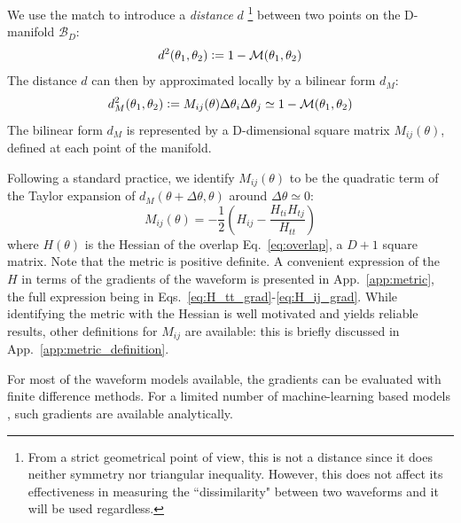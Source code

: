 \documentclass[twocolumn,showpacs,preprintnumbers,nofootinbib,prd,
superscriptaddress,10pt]{revtex4-2}
\begin{document}
We use the match to introduce a {\it distance} $d$ \footnote{
From a strict geometrical point of view, this is not a distance since it does neither symmetry nor triangular inequality. However, this does not affect its effectiveness in measuring the ``dissimilarity" between two waveforms and it will be used regardless.}
between two points on the D-manifold $\mathcal{B}_D$:
\begin{align}\label{eq:distance}
	d^2(\theta_1,\theta_2) \vcentcolon= 1 - \mathcal{M}(\theta_1,\theta_2)
\end{align}
The distance $d$ can then by approximated locally by a bilinear form $d_M$:
\begin{align}\label{eq:metric_definition}
	d_M^2(\theta_1,\theta_2) \vcentcolon= M_{ij}(\theta) \Delta\theta_i \Delta\theta_j \simeq 1 - \mathcal{M}(\theta_1,\theta_2)
\end{align}
The bilinear form $d_M$ is represented by a D-dimensional square matrix $M_{ij}(\theta)$, defined at each point of the manifold.

Following a standard practice, we identify $M_{ij}(\theta)$ to be the quadratic term of the Taylor expansion of $d_M(\theta+\Delta\theta,\theta)$ around $\Delta\theta\simeq 0$:
\begin{equation}\label{eq:metric_expression}
	M_{ij}(\theta) = - \frac{1}{2} \left( H_{ij} - \frac{H_{ti}H_{tj}}{H_{tt}} \right)
\end{equation}
where $H(\theta)$ is the Hessian of the overlap Eq.~\eqref{eq:overlap}, a $D+1$ square matrix.
Note that the metric is positive definite. A convenient expression of the $H$ in terms of the gradients of the waveform is presented in App.~\ref{app:metric}, the full expression being in Eqs.~\eqref{eq:H_tt_grad}-\eqref{eq:H_ij_grad}.
While identifying the metric with the Hessian is well motivated and yields reliable results, other definitions for $M_{ij}$ are available: this is briefly discussed in App.~\ref{app:metric_definition}.

For most of the waveform models available, the gradients can be evaluated with finite difference methods. For a limited number of machine-learning based models \cite{Khan:2020fso, PhysRevD.103.043020, ML_wf_model, Tissino:2022thn}, such gradients are available analytically.
\end{document}

